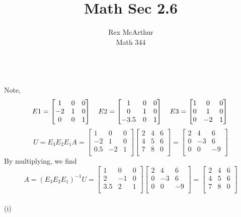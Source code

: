 \documentclass[letterpaper,12pt]{article}
\title{Math Sec 2.6}
\author{Rex McArthur\\Math 344}
\theoremstyle{definition}
\begin{document}
\maketitle
{}\\
Note,
\[
E1 = 
\begin{bmatrix}
     1 & 0 & 0 \\
    -2 & 1 & 0 \\
     0 & 0 & 1 \\
\end{bmatrix} \quad
E2 = 
\begin{bmatrix}
     1 & 0 & 0 \\
     0 & 1 & 0 \\
    -3.5 & 0 & 1 \\
\end{bmatrix} \quad
E3 = 
\begin{bmatrix}
     1 & 0 & 0 \\
     0 & 1 & 0 \\
     0 & -2 & 1 \\
\end{bmatrix} \\
\]
\[ U = E_3E_2E_1A =
\begin{bmatrix}
     1 & 0 & 0 \\
     -2 & 1 & 0 \\
     0.5 & -2 & 1 \\
\end{bmatrix}
\begin{bmatrix}
     2 & 4 & 6 \\
     4 & 5 & 6 \\
     7 & 8 & 0 \\
\end{bmatrix}
=
\begin{bmatrix}
     2 & 4 & 6 \\
     0 & -3 & 6 \\
     0 & 0 & -9 \\
\end{bmatrix}
\]
By multiplying, we find
\[
A=(E_3E_2E_1)^{-1}U = 
\begin{bmatrix}
     1 & 0 & 0 \\
     2 & -1 & 0 \\
     3.5 & 2 & 1 \\
\end{bmatrix}
\begin{bmatrix}
     2 & 4 & 6 \\
     0 & -3 & 6 \\
     0 & 0 & -9 \\
\end{bmatrix}
=
\begin{bmatrix}
     2 & 4 & 6 \\
     4 & 5 & 6 \\
     7 & 8 & 0 \\
\end{bmatrix}
\]
\\
(i)\\
\end{document}

